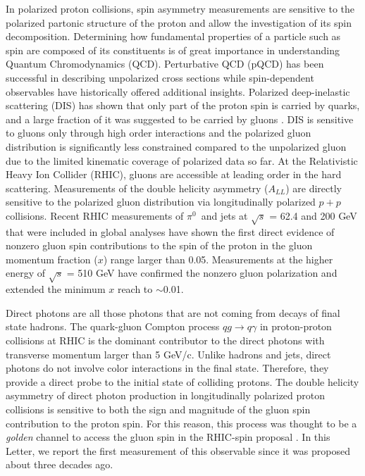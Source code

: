 \documentclass[twocolumn,letterpaper,aps,prl,longbibliography,superscriptaddress,floatfix]{revtex4-2}
\newcommand{\pizero}{\ensuremath{\pi^0}}
\newcommand{\ALL}{\ensuremath{A_{LL}}}
\begin{document}
In polarized proton collisions, spin asymmetry measurements are sensitive to the polarized partonic structure of the proton and allow the investigation of its spin decomposition. Determining how fundamental properties of a particle such as spin are composed of its constituents is of great importance in understanding Quantum Chromodynamics (QCD). Perturbative QCD (pQCD) has been successful in describing unpolarized cross sections while spin-dependent observables have historically offered additional insights. Polarized deep-inelastic scattering (DIS) has shown that only part of the proton spin is carried by quarks, and a large fraction of it was suggested to be carried by gluons \cite{1988364, ASHMAN19891, PhysRevD.58.112001, ALEXAKHIN20078, PhysRevD.75.012007}. DIS is sensitive to gluons only through high order interactions and the polarized gluon distribution is significantly less constrained compared to the unpolarized gluon due to the limited kinematic coverage of polarized data so far. At the Relativistic Heavy Ion Collider (RHIC), gluons are accessible at leading order in the hard scattering. Measurements of the double helicity asymmetry (\ALL) are directly sensitive to the polarized gluon distribution via longitudinally polarized $p+p$ collisions. Recent RHIC measurements of \pizero\ and jets at  $\sqrt{s}$ = 62.4 and 200 GeV \cite{PhysRevD.90.012007, PhysRevLett.103.012003, PhysRevD.79.012003, PhysRevD.86.032006, PhysRevLett.115.092002} that were included in global analyses have shown the first direct evidence of nonzero gluon spin contributions to the spin of the proton \cite{PhysRevLett.113.012001, 2014276} in the gluon momentum fraction ($x$) range larger than 0.05. Measurements at the higher energy of $\sqrt{s}$ = 510 GeV \cite{PhysRevD.93.011501, PhysRevD.100.052005} have confirmed the nonzero gluon polarization and extended the minimum $x$ reach to $\sim$0.01.

Direct photons are all those photons that are not coming from decays of final state hadrons. The quark-gluon Compton process $qg \rightarrow q\gamma$ in proton-proton collisions at RHIC is the dominant contributor to the direct photons with transverse momentum larger than 5 GeV/c. Unlike hadrons and jets, direct photons do not involve color interactions in the final state. Therefore, they provide a direct probe to the initial state of colliding protons. The double helicity asymmetry of direct photon production in longitudinally polarized proton collisions is sensitive to both the sign and magnitude of the gluon spin contribution to the proton spin. For this reason, this process was thought to be a \textit{golden} channel to access the gluon spin in the RHIC-spin proposal \cite{Bunce:1992vca, doi:10.1146/annurev.nucl.50.1.525}. In this Letter, we report the first measurement of this observable since it was proposed about three decades ago.
\end{document}
